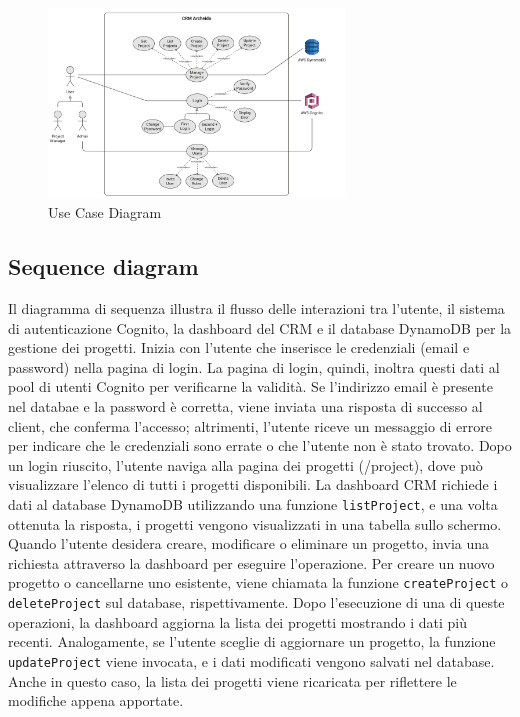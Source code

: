 \documentclass[target=bach,aauheader=,style=]{thud}
\begin{document}
\begin{figure}[H]
    \centering
    \includegraphics[width=0.7\textwidth]{img/diagrammi/use_case.pdf} 
    \caption{Use Case Diagram}
\end{figure}

\subsection{Sequence diagram}
Il diagramma di sequenza illustra il flusso delle interazioni tra l'utente, il sistema di autenticazione Cognito, la dashboard del CRM e il database DynamoDB per la gestione dei progetti. Inizia con l'utente che inserisce le credenziali (email e password) nella pagina di login. La pagina di login, quindi, inoltra questi dati al pool di utenti Cognito per verificarne la validità. Se l'indirizzo email è presente nel databae e la password è corretta, viene inviata una risposta di successo al client, che conferma l'accesso; altrimenti, l'utente riceve un messaggio di errore per indicare che le credenziali sono errate o che l'utente non è stato trovato. Dopo un login riuscito, l'utente naviga alla pagina dei progetti (/project), dove può visualizzare l'elenco di tutti i progetti disponibili. La dashboard CRM richiede i dati al database DynamoDB utilizzando una funzione \texttt{listProject}, e una volta ottenuta la risposta, i progetti vengono visualizzati in una tabella sullo schermo. Quando l'utente desidera creare, modificare o eliminare un progetto, invia una richiesta attraverso la dashboard per eseguire l'operazione. Per creare un nuovo progetto o cancellarne uno esistente, viene chiamata la funzione \texttt{createProject} o \texttt{deleteProject} sul database, rispettivamente. Dopo l'esecuzione di una di queste operazioni, la dashboard aggiorna la lista dei progetti mostrando i dati più recenti. Analogamente, se l'utente sceglie di aggiornare un progetto, la funzione \texttt{updateProject} viene invocata, e i dati modificati vengono salvati nel database. Anche in questo caso, la lista dei progetti viene ricaricata per riflettere le modifiche appena apportate.
\end{document}
